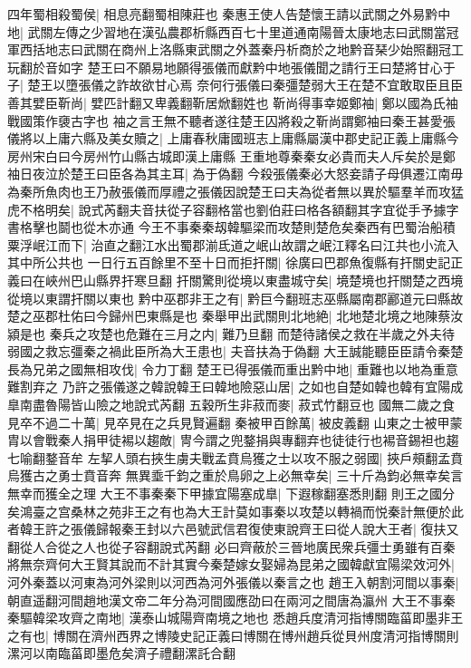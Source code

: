 四年蜀相殺蜀侯|{
	相息亮翻蜀相陳莊也}
秦惠王使人告楚懷王請以武關之外易黔中地|{
	武關左傳之少習地在漢弘農郡析縣西百七十里道通南陽晉太康地志曰武關當冠軍西括地志曰武關在商州上洛縣東武關之外蓋秦丹析商於之地黔音琹少始照翻冠工玩翻於音如字}
楚王曰不願易地願得張儀而獻黔中地張儀聞之請行王曰楚將甘心于子|{
	楚王以墮張儀之詐故欲甘心焉}
奈何行張儀曰秦彊楚弱大王在楚不宜敢取臣且臣善其嬖臣靳尚|{
	嬖匹計翻又卑義翻靳居焮翻姓也}
靳尚得事幸姬鄭袖|{
	鄭以國為氏袖戰國策作褏古字也}
袖之言王無不聽者遂往楚王囚將殺之靳尚謂鄭袖曰秦王甚愛張儀將以上庸六縣及美女贖之|{
	上庸春秋庸國班志上庸縣屬漢中郡史記正義上庸縣今房州宋白曰今房州竹山縣古城即漢上庸縣}
王重地尊秦秦女必貴而夫人斥矣於是鄭袖日夜泣於楚王曰臣各為其主耳|{
	為于偽翻}
今殺張儀秦必大怒妾請子母俱遷江南毋為秦所魚肉也王乃赦張儀而厚禮之張儀因說楚王曰夫為從者無以異於驅羣羊而攻猛虎不格明矣|{
	說式芮翻夫音扶從子容翻格當也劉伯莊曰格各額翻其字宜從手予據字書格擊也鬬也從木亦通}
今王不事秦秦刼韓驅梁而攻楚則楚危矣秦西有巴蜀治船積粟浮岷江而下|{
	治直之翻江水出蜀郡湔氐道之岷山故謂之岷江釋名曰江共也小流入其中所公共也}
一日行五百餘里不至十日而拒扞關|{
	徐廣曰巴郡魚復縣有扞關史記正義曰在峽州巴山縣界扞寒旦翻}
扞關驚則從境以東盡城守矣|{
	境楚境也扞關楚之西境從境以東謂扞關以東也}
黔中巫郡非王之有|{
	黔巨今翻班志巫縣屬南郡酈道元曰縣故楚之巫郡杜佑曰今歸州巴東縣是也}
秦舉甲出武關則北地絶|{
	北地楚北境之地陳蔡汝潁是也}
秦兵之攻楚也危難在三月之内|{
	難乃旦翻}
而楚待諸侯之救在半歲之外夫待弱國之救忘彊秦之禍此臣所為大王患也|{
	夫音扶為于偽翻}
大王誠能聽臣臣請令秦楚長為兄弟之國無相攻伐|{
	令力丁翻}
楚王已得張儀而重出黔中地|{
	重難也以地為重意難割弃之}
乃許之張儀遂之韓說韓王曰韓地險惡山居|{
	之如也自楚如韓也韓有宜陽成臯南盡魯陽皆山險之地說式芮翻}
五穀所生非菽而麥|{
	菽式竹翻豆也}
國無二歲之食見卒不過二十萬|{
	見卒見在之兵見賢遍翻}
秦被甲百餘萬|{
	被皮義翻}
山東之士被甲蒙胄以會戰秦人捐甲徒裼以趨敵|{
	冑今謂之兜鍪捐與專翻弃也徒徒行也裼音錫袒也趨七喻翻鍪音牟}
左挈人頭右挾生虜夫戰孟賁烏獲之士以攻不服之弱國|{
	挾戶頰翻孟賁烏獲古之勇士賁音奔}
無異埀千鈞之重於鳥卵之上必無幸矣|{
	三十斤為鈞必無幸矣言無幸而獲全之理}
大王不事秦秦下甲據宜陽塞成臯|{
	下遐稼翻塞悉則翻}
則王之國分矣鴻臺之宫桑林之苑非王之有也為大王計莫如事秦以攻楚以轉禍而悦秦計無便於此者韓王許之張儀歸報秦王封以六邑號武信君復使東說齊王曰從人說大王者|{
	復扶又翻從人合從之人也從子容翻說式芮翻}
必曰齊蔽於三晉地廣民衆兵彊士勇雖有百秦將無奈齊何大王賢其說而不計其實今秦楚嫁女娶婦為昆弟之國韓獻宜陽梁效河外|{
	河外秦蓋以河東為河外梁則以河西為河外張儀以秦言之也}
趙王入朝割河間以事秦|{
	朝直遥翻河間趙地漢文帝二年分為河間國應劭曰在兩河之間唐為瀛州}
大王不事秦秦驅韓梁攻齊之南地|{
	漢泰山城陽齊南境之地也}
悉趙兵度清河指博關臨菑即墨非王之有也|{
	博關在濟州西界之博陵史記正義曰博關在博州趙兵從貝州度清河指博關則漯河以南臨菑即墨危矣濟子禮翻漯託合翻}
